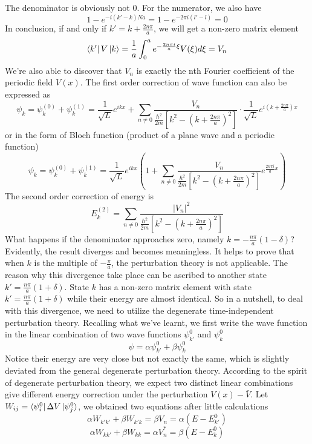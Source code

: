 \documentclass{article}
\begin{document}
The denominator is obviously not $0$. For the numerator, we also have\begin{equation}
    1-e^{-i(k'-k)Na}=1-e^{-2\pi{i}(l'-l)}=0
\end{equation}
In conclusion, if and only if $k'=k+\frac{2n\pi}{a}$, we will get a non-zero matrix element\begin{equation}
    \bra{k'}V\ket{k}=\frac{1}{a}\int_0^{a}e^{-\frac{2n\pi{i}}{a}\xi}V(\xi)d\xi=V_n
\end{equation}
We're also able to discover that $V_n$ is exactly the nth Fourier coefficient of the periodic field $V(x)$. The first order correction of wave function can also be expressed as\begin{equation}
    \psi_k=\psi_k^{(0)}+\psi_k^{(1)}=\frac{1}{\sqrt{L}}e^{ikx}+\sum_{n\neq0}\frac{V_n}{\frac{\hbar^2}{2m}[k^2-(k+\frac{2n\pi}{a})^2]}\cdot\frac{1}{\sqrt{L}}e^{i(k+\frac{2n\pi}{a})x}
\end{equation}
or in the form of Bloch function (product of a plane wave and a periodic function)\begin{equation}
    \psi_k=\psi_k^{(0)}+\psi_k^{(1)}=\frac{1}{\sqrt{L}}e^{ikx}(1+\sum_{n\neq0}\frac{V_n}{\frac{\hbar^2}{2m}[k^2-(k+\frac{2n\pi}{a})^2]}e^{\frac{2n\pi{i}}{a}x})
\end{equation}
The second order correction of energy is\begin{equation}
    E_k^{(2)}=\sum_{n\neq0}\frac{|V_n|^2}{\frac{\hbar^2}{2m}[k^2-(k+\frac{2n\pi}{a})^2]}
\end{equation}
What happens if the denominator approaches zero, namely $k=-\frac{n\pi}{a}(1-\delta)$? Evidently, the result diverges and becomes meaningless. It helps to prove that when $k$ is the multiple of $-\frac{\pi}{a}$, the perturbation theory is not applicable. The reason why this divergence take place can be ascribed to another state $k'=\frac{n\pi}{a}(1+\delta)$. State $k$ has a non-zero matrix element with state $k'=\frac{n\pi}{a}(1+\delta)$ while their energy are almost identical. So in a nutshell, to deal with this divergence, we need to utilize the degenerate time-independent perturbation theory. Recalling what we've learnt, we first write the wave function in the linear combination of two wave functions $\psi_{k'}^0$ and $\psi_k^0$\begin{equation}
    \psi=\alpha\psi_{k'}^0+\beta\psi_k^0
\end{equation}
Notice their energy are very close but not exactly the same, which is slightly deviated from the general degenerate perturbation theory. According to the spirit of degenerate perturbation theory, we expect two distinct linear combinations give different energy correction under the perturbation $V(x)-\bar{V}$. Let $W_{ij}=\bra{\psi_i^0}\Delta{V}\ket{\psi_j^0}$, we obtained two equations after little calculations\begin{equation}
    \alpha{W}_{k'k'}+\beta{W}_{k'k}=\beta{V}_n=\alpha(E-E_{k'}^0) 
\end{equation}\begin{equation}
    \alpha{W}_{kk'}+\beta{W}_{kk}=\alpha{V}_n^*=\beta(E-E_k^0)
\end{equation}
\end{document}
